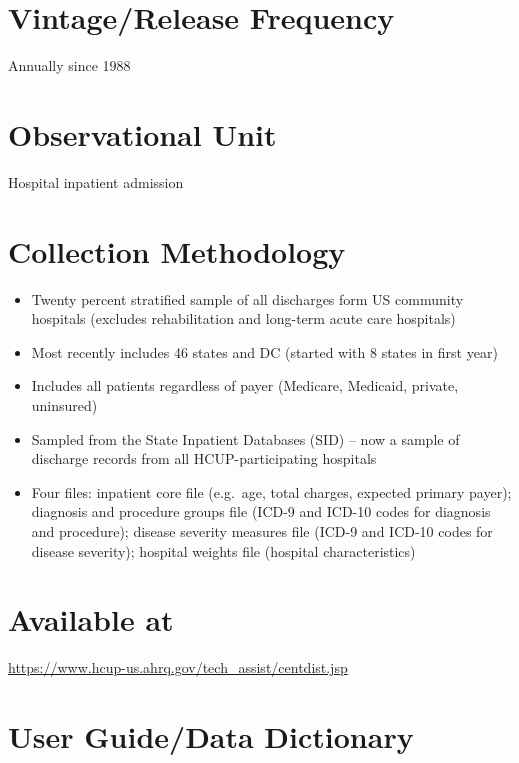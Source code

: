 \documentclass[
]{book}
\providecommand{\tightlist}{%
  \setlength{\itemsep}{0pt}\setlength{\parskip}{0pt}}
\begin{document}
\hypertarget{vintagerelease-frequency-54}{%
\section{Vintage/Release Frequency}\label{vintagerelease-frequency-54}}

Annually since 1988

\hypertarget{observational-unit-54}{%
\section{Observational Unit}\label{observational-unit-54}}

Hospital inpatient admission

\hypertarget{collection-methodology-54}{%
\section{Collection Methodology}\label{collection-methodology-54}}

\begin{itemize}
\tightlist
\item
  Twenty percent stratified sample of all discharges form US community hospitals (excludes rehabilitation and long-term acute care hospitals)
\item
  Most recently includes 46 states and DC (started with 8 states in first year)
\item
  Includes all patients regardless of payer (Medicare, Medicaid, private, uninsured)
\item
  Sampled from the State Inpatient Databases (SID) -- now a sample of discharge records from all HCUP-participating hospitals
\item
  Four files: inpatient core file (e.g.~age, total charges, expected primary payer); diagnosis and procedure groups file (ICD-9 and ICD-10 codes for diagnosis and procedure); disease severity measures file (ICD-9 and ICD-10 codes for disease severity); hospital weights file (hospital characteristics)
\end{itemize}

\hypertarget{available-at-54}{%
\section{Available at}\label{available-at-54}}

\url{https://www.hcup-us.ahrq.gov/tech_assist/centdist.jsp}

\hypertarget{user-guidedata-dictionary-54}{%
\section{User Guide/Data Dictionary}\label{user-guidedata-dictionary-54}}
\end{document}
